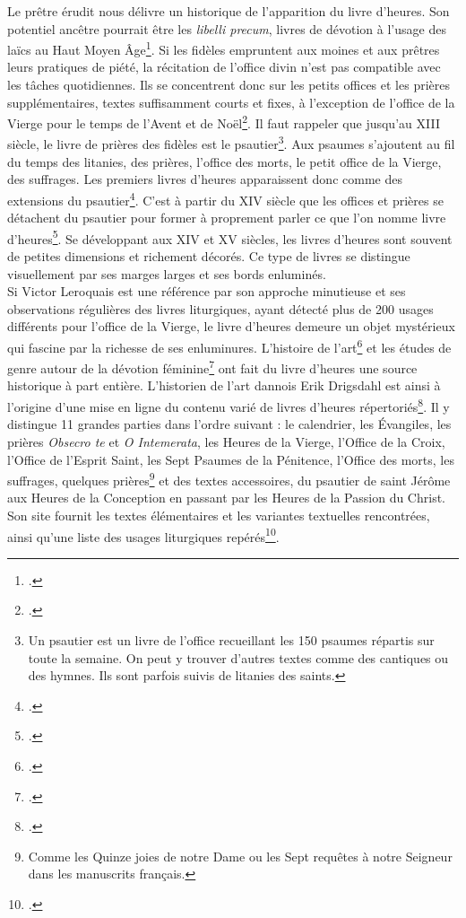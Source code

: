 \documentclass[a4paper,12pt,twoside]{book}
\begin{document}
Le prêtre érudit nous délivre un historique de l'apparition du livre d'heures. Son potentiel ancêtre pourrait être les \textit{libelli precum}, livres de dévotion à l'usage des laïcs au Haut Moyen Âge\footcite[p. IX]{Leroquais_notices}. Si les fidèles empruntent aux moines et aux prêtres leurs pratiques de piété, la récitation de l’office divin n’est pas compatible avec les tâches quotidiennes. Ils se concentrent donc sur les petits offices et les prières supplémentaires, textes suffisamment courts et fixes, à l’exception de l’office de la Vierge pour le temps de l’Avent et de Noël\footcite[p. X]{Leroquais_notices}. Il faut rappeler que jusqu'au \textsc{XIII} siècle, le livre de prières des fidèles est le psautier\footnote{Un psautier est un livre de l'office recueillant les 150 psaumes répartis sur toute la semaine. On peut y trouver d'autres textes comme des cantiques ou des hymnes. Ils sont parfois suivis de litanies des saints.}. Aux psaumes s'ajoutent au fil du temps des litanies, des prières, l’office des morts, le petit office de la Vierge, des suffrages. Les premiers livres d'heures apparaissent donc comme des extensions du psautier\footcite[p. X]{Leroquais_notices}. C'est à partir du \textsc{XIV} siècle que les offices et prières se détachent du psautier pour former à proprement parler ce que l'on nomme livre d'heures\footcite[p. XII]{Leroquais_notices}. Se développant aux \textsc{XIV} et \textsc{XV} siècles, les livres d'heures sont souvent de petites dimensions et richement décorés. Ce type de livres se distingue visuellement par ses marges larges et ses bords enluminés.\\

Si Victor Leroquais est une référence par son approche minutieuse et ses observations régulières des livres liturgiques, ayant détecté plus de 200 usages différents pour l’office de la Vierge, le livre d'heures demeure un objet mystérieux qui fascine par la richesse de ses enluminures. L'histoire de l'art\footcite{livres_enllumines} et les études de genre autour de la dévotion féminine\footcite{Women_Books_Hours} ont fait du livre d'heures une source historique à part entière. L'historien de l'art dannois Erik Drigsdahl est ainsi à l'origine d'une mise en ligne du contenu varié de livres d'heures répertoriés\footcite{Intro_Book_of_H}. Il y distingue 11 grandes parties dans l'ordre suivant : le calendrier, les Évangiles, les prières \textit{Obsecro te} et \textit{O Intemerata}, les Heures de la Vierge, l'Office de la Croix, l'Office de l'Esprit Saint, les Sept Psaumes de la Pénitence, l'Office des morts, les suffrages, quelques prières\footnote{Comme les Quinze joies de notre Dame ou les Sept requêtes à notre Seigneur dans les manuscrits français.} et des textes accessoires, du psautier de saint Jérôme aux Heures de la Conception en passant par les Heures de la Passion du Christ. Son site fournit les textes élémentaires et les variantes textuelles rencontrées, ainsi qu'une liste des usages liturgiques repérés\footcite{Usages_HVierge}. 
\end{document}
